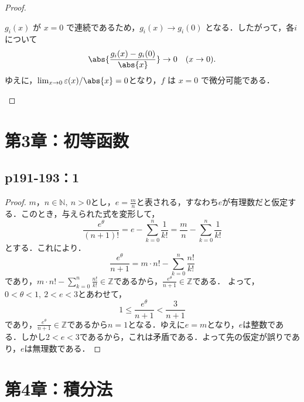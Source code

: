 \documentclass[uplatex,dvipdfmx,a4paper,10pt,fleqn]{jsarticle}
\begin{document}
\begin{tleftbar}
\begin{proof}
\begin{description}
            $ g_i(x) $ が $ x=0 $ で連続であるため，$ g_i(x) \to g_i(0) $ となる．したがって，各$ i $について
            \[
            \abs{ \frac{g_i(x) - g_i(0)}{\abs{x}} } \to 0 \quad (x \to 0).
            \]
            ゆえに，$\lim_{x \to 0} \varepsilon(x)/\abs{x} = 0$となり，$ f $ は $ x=0 $ で微分可能である．
        \end{description}
    \end{proof}
\end{tleftbar}

\section*{第3章：初等函数}


\subsection*{p191-193：1}


\begin{tleftbar}
    \begin{proof}
        $m，n \in \mathbb{N},~n >0$とし，$e=\frac{m}{n}$と表される，すなわち$e$が有理数だと仮定する．このとき，与えられた式を変形して，
        \[
            \frac{e^\theta}{(n+1)!} = e-\sum_{k=0}^{n} \frac{1}{k!} =\frac{m}{n}-\sum_{k=0}^{n} \frac{1}{k!}
        \]
        とする．これにより．
        \[
            \frac{e^{\theta}}{n+1} = m \cdot n! - \sum_{k=0}^{n} \frac{n!}{k!}
        \]
        であり，$m \cdot n! - \sum_{k=0}^{n} \frac{n!}{k!} \in \mathbb{Z}$であるから，$\frac{e^{\theta}}{n+1} \in \mathbb{Z}$である．
        よって，$0< \theta <1,~2<e<3$とあわせて，
        \[
            1 \le \frac{e^{\theta}}{n+1} < \frac{3}{n+1}
        \]
        であり，$\frac{e^{\theta}}{n+1} \in \mathbb{Z}$であるから$n=1$となる．ゆえに$e=m$となり，$e$は整数である．しかし$2<e<3$であるから，これは矛盾である．よって先の仮定が誤りであり，$e$は無理数である．
    \end{proof}
\end{tleftbar}
\newpage 

\section*{第4章：積分法}
\end{document}
